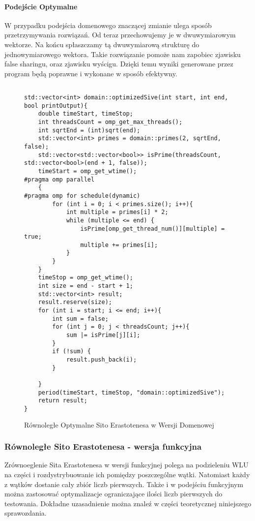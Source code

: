 \documentclass{article}
\begin{document}
                \paragraph{Podejście Optymalne}
                    W przypadku podejścia domenowego znaczącej zmianie ulega sposób przetrzymywania rozwiązań. Od teraz przechowujemy je w dwuwymiarowym wektorze. Na końcu spłaszczamy tą dwuwymiarową strukturę do jednowymiarowego wektora. Takie rozwiązanie pomoże nam zapobiec zjawisku false sharingu, oraz zjawisku wyścigu. Dzięki temu wyniki generowane przez program będą poprawne i wykonane w sposób efektywny.
                    \begin{figure}[H]
                        \begin{verbatim}

std::vector<int> domain::optimizedSive(int start, int end, bool printOutput){
    double timeStart, timeStop;
    int threadsCount = omp_get_max_threads();
    int sqrtEnd = (int)sqrt(end);
    std::vector<int> primes = domain::primes(2, sqrtEnd, false);
    std::vector<std::vector<bool>> isPrime(threadsCount, std::vector<bool>(end + 1, false));
    timeStart = omp_get_wtime();
#pragma omp parallel
    {
#pragma omp for schedule(dynamic)
        for (int i = 0; i < primes.size(); i++){
            int multiple = primes[i] * 2;
            while (multiple <= end) {
                isPrime[omp_get_thread_num()][multiple] = true;
                multiple += primes[i];
            }
        }
    }
    timeStop = omp_get_wtime();
    int size = end - start + 1;
    std::vector<int> result;
    result.reserve(size);
    for (int i = start; i <= end; i++){
        int sum = false;
        for (int j = 0; j < threadsCount; j++){
            sum |= isPrime[j][i];
        }
        if (!sum) {
            result.push_back(i);
        }

    }
    period(timeStart, timeStop, "domain::optimizedSive");
    return result;
}
                        \end{verbatim}
                        \caption{Równoległe Optymalne Sito Erastotenesa w Wersji Domenowej}
                    \end{figure}
                
                \subsubsection{Równoległe Sito Erastotenesa - wersja funkcyjna}
                    Zrównoeglenie Sita Erastotenesa w wersji funkcyjnej polega na podzieleniu \gls{WLU} na części i rozdystrybuowanie ich pomiędzy poszczególne wątki. Natomiast każdy z wątków dostanie cały zbiór liczb pierwszych. Także i w podejściu funkcyjnym można zastosować optymalizacje ograniczające ilości liczb pierwszych do testowania. Dokładne uzasadnienie można znaleź w części teoretycznej niniejszego sprawozdania.
\end{document}
